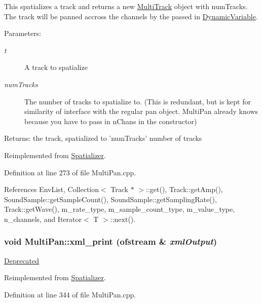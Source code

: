 This spatializes a track and returns a new \hyperlink{classMultiTrack}{Multi\-Track} object with num\-Tracks. The track will be panned accross the channels by the passed in \hyperlink{classDynamicVariable}{Dynamic\-Variable}. \begin{Desc}
\item[Parameters:]
\begin{description}
\item[{\em t}]A track to spatialize \item[{\em num\-Tracks}]The number of tracks to spatialize to. (This is redundant, but is kept for similarity of interface with the regular pan object. Multi\-Pan already knows because you have to pass in n\-Chans in the constructor) \end{description}
\end{Desc}
\begin{Desc}
\item[Returns:]the track, spatialized to 'num\-Tracks' number of tracks \end{Desc}


Reimplemented from \hyperlink{classSpatializer_a0}{Spatializer}.

Definition at line 273 of file Multi\-Pan.cpp.

References Env\-List, Collection$<$ Track $\ast$ $>$::get(), Track::get\-Amp(), Sound\-Sample::get\-Sample\-Count(), Sound\-Sample::get\-Sampling\-Rate(), Track::get\-Wave(), m\_\-rate\_\-type, m\_\-sample\_\-count\_\-type, m\_\-value\_\-type, n\_\-channels, and Iterator$<$ T $>$::next().\hypertarget{classMultiPan_a7}{
\subsubsection[xml\_\-print]{\setlength{\rightskip}{0pt plus 5cm}void Multi\-Pan::xml\_\-print (ofstream \& {\em xml\-Output})}}
\label{classMultiPan_a7}


\begin{Desc}
\item[\hyperlink{deprecated__deprecated000022}{Deprecated}]\end{Desc}


Reimplemented from \hyperlink{classSpatializer_a2}{Spatializer}.

Definition at line 344 of file Multi\-Pan.cpp.

